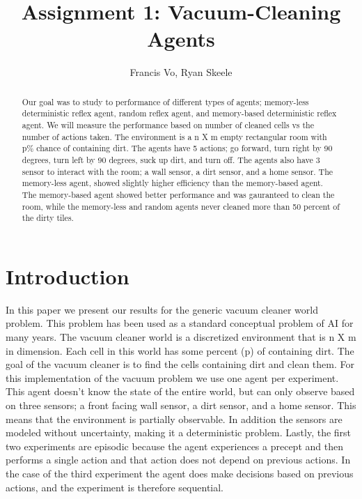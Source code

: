 \documentclass[a4paper,10pt]{article}
\title{Assignment 1: Vacuum-Cleaning Agents}
\author{Francis Vo, Ryan Skeele}
\begin{document}
\maketitle
\begin{abstract}
Our goal was to study to performance of different types of agents; memory-less deterministic reflex agent, random reflex agent, and memory-based deterministic reflex agent.
We will measure the performance based on number of cleaned cells vs the number of actions taken.
The environment is a n X m empty rectangular room with p\% chance of containing dirt.
The agents have 5 actions; go forward, turn right by 90 degrees, turn left by 90 degrees, suck up dirt, and turn off.
The agents also have 3 sensor to interact with the room; a wall sensor, a dirt sensor, and a home sensor.
The memory-less agent, showed slightly higher efficiency than the memory-based agent.
The memory-based agent showed better performance and was gauranteed to clean the room, while the memory-less and random agents never cleaned more than 50 percent of the dirty tiles.
\end{abstract}

\section{Introduction}

In this paper we present our results for the generic vacuum cleaner world problem.
This problem has been used as a standard conceptual problem of AI for many years.
The vacuum cleaner world is a discretized environment that is n X m in dimension.
Each cell in this world has some percent (p) of containing dirt.
The goal of the vacuum cleaner is to find the cells containing dirt and clean them.
For this implementation of the vacuum problem we use one agent per experiment.
This agent doesn't know the state of the entire world, but can only observe based on three sensors; a front facing wall sensor, a dirt sensor, and a home sensor.
This means that the environment is partially observable.
In addition the sensors are modeled without uncertainty, making it a deterministic problem.
Lastly, the first two experiments are episodic because the agent experiences a precept and then performs a single action and that action does not depend on previous actions.
In the case of the third experiment the agent does make decisions based on previous actions, and the experiment is therefore sequential.

\end{document}
